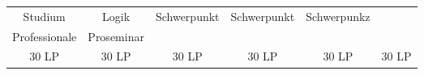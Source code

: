 \begin{table}[htbp]
{\begin{tabular}{|cccccc|}
			\multicolumn{1}{|c|}{Studium}      	   & \multicolumn{1}{c|}{Logik}            & \multicolumn{1}{c|}{Schwerpunkt}      & \multicolumn{1}{c|}{Schwerpunkt}   & \multicolumn{1}{c|}{Schwerpunkz}      &                \\ \cline{2-2} \cline{5-5}
			\multicolumn{1}{|c|}{Professionale}    & \multicolumn{1}{c|}{Proseminar}       & \multicolumn{1}{c|}{}                 & \multicolumn{1}{c|}{}              & \multicolumn{1}{c|}{}					&                \\ \hline
			30 LP                                  & 30 LP                                 & 30 LP                                 & 30 LP                              & 30 LP                                 & 30 LP          \\ \hline
		\end{tabular}}
\end{table}
